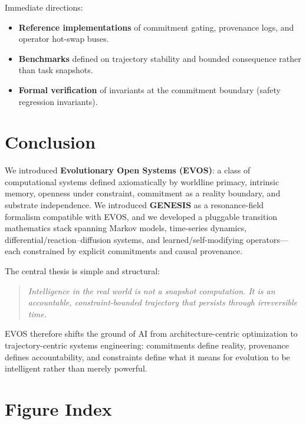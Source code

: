 \documentclass[11pt]{article}
\begin{document}
Immediate directions:
\begin{itemize}
  \item \textbf{Reference implementations} of commitment gating, provenance logs, and operator hot-swap buses.
  \item \textbf{Benchmarks} defined on trajectory stability and bounded consequence rather than task snapshots.
  \item \textbf{Formal verification} of invariants at the commitment boundary (safety regression invariants).
\end{itemize}

\section{Conclusion}
\label{sec:conclusion}

We introduced \textbf{Evolutionary Open Systems (EVOS)}: a class of computational systems defined
axiomatically by worldline primacy, intrinsic memory, openness under constraint, commitment as
a reality boundary, and substrate independence. We introduced \textbf{GENESIS} as a resonance-field
formalism compatible with EVOS, and we developed a pluggable transition mathematics stack spanning
Markov models, time-series dynamics, differential/reaction--diffusion systems, and learned/self-modifying
operators—each constrained by explicit commitments and causal provenance.

The central thesis is simple and structural:

\begin{quote}
\emph{Intelligence in the real world is not a snapshot computation. It is an accountable,
constraint-bounded trajectory that persists through irreversible time.}
\end{quote}

EVOS therefore shifts the ground of AI from architecture-centric optimization to trajectory-centric
systems engineering: commitments define reality, provenance defines accountability, and constraints define
what it means for evolution to be intelligent rather than merely powerful.





\appendix
\section{Figure Index}
\label{app:figure-index}
\end{document}
